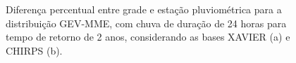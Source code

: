 \documentclass[
]{agujournal2019}
\begin{document}
\begin{figure}

\begin{minipage}{\linewidth}



\end{minipage}%
\newline
\begin{minipage}{\linewidth}



\end{minipage}%

\caption{\label{fig-Figura21}Diferença percentual entre grade e estação
pluviométrica para a distribuição GEV-MME, com chuva de duração de 24
horas para tempo de retorno de 2 anos, considerando as bases XAVIER (a)
e CHIRPS (b).}

\end{figure}%
\end{document}
